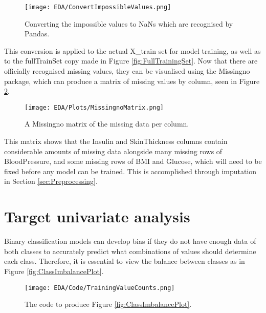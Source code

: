 \begin{figure}[H]
    \centering
    \texttt{[image: EDA/ConvertImpossibleValues.png]} 
    \caption{Converting the impossible values to NaNs which are recognised by Pandas.}
    \label{fig:ConvertImpossibleValues}
\end{figure}

\para This conversion is applied to the actual X\_train set for model training, as well as to the fullTrainSet copy made in Figure \ref{fig:FullTrainingSet}.
Now that there are officially recognised missing values, they can be visualised using the Missingno package, which can produce a 
matrix of missing values by column, seen in Figure \ref{fig:MissingnoMatrix}.

\begin{figure}[H]
    \centering
    \texttt{[image: EDA/Plots/MissingnoMatrix.png]}
    \caption{A Missingno matrix of the missing data per column.}
    \label{fig:MissingnoMatrix}
\end{figure}


\para This matrix shows that the Insulin and SkinThickness columns contain considerable amounts of missing data alongside
many missing rows of BloodPressure, and some missing rows of BMI and Glucose, 
which will need to be fixed before any model can be trained. This is accomplished through imputation in Section 
\ref{sec:Preprocessing}.


\pagebreak 


\section{Target univariate analysis}\label{ASec:Imbalance}
Binary classification models can develop bias if they do not have enough data of both classes to accurately predict what combinations 
of values should determine each class. Therefore, it is essential to view the balance between classes as in Figure \ref{fig:ClassImbalancePlot}.

\begin{figure}[H]
    \centering
    \texttt{[image: EDA/Code/TrainingValueCounts.png]}
    \caption{The code to produce Figure \ref{fig:ClassImbalancePlot}.}
    \label{fig:ClassImbalancePlotCode}
\end{figure}

